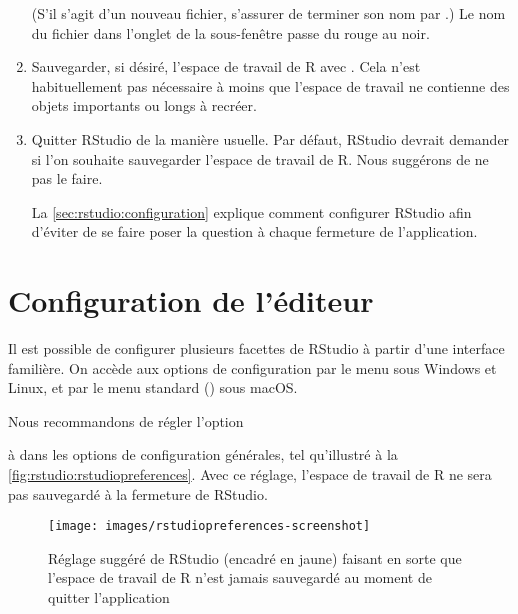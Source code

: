 \begin{enumerate}
\begin{trivlist}
    \hfill
  \end{trivlist}
  (S'il s'agit d'un nouveau fichier, s'assurer de terminer son nom par
  .) Le nom du fichier dans l'onglet de la sous-fenêtre passe
  du rouge au noir.
\item Sauvegarder, si désiré, l'espace de travail de R avec
  . Cela n'est
  habituellement pas nécessaire à moins que l'espace de travail ne
  contienne des objets importants ou longs à recréer.
\item Quitter RStudio de la manière usuelle. Par défaut, RStudio
  devrait demander si l'on souhaite sauvegarder l'espace de travail de
  R. Nous suggérons de ne pas le faire.

  La \autoref{sec:rstudio:configuration} explique comment configurer
  RStudio afin d'éviter de se faire poser la question à chaque
  fermeture de l'application.
\end{enumerate}


\section{Configuration de l'éditeur}
\label{sec:rstudio:configuration}

Il est possible de configurer plusieurs facettes de RStudio à partir
d'une interface familière. On accède aux options de configuration par
le menu  sous Windows et Linux, et par le
menu standard  (\code{\cmdkey\,,})
sous macOS.

Nous recommandons de régler l'option
\begin{quote}
\end{quote}
à  dans les options de configuration générales,
tel qu'illustré à la \autoref{fig:rstudio:rstudiopreferences}. Avec ce
réglage, l'espace de travail de R ne sera pas sauvegardé à la
fermeture de RStudio.

\begin{figure}
  \centering
  \texttt{[image: images/rstudiopreferences-screenshot]}
  \caption{Réglage suggéré de RStudio (encadré en jaune) faisant en
    sorte que l'espace de travail de R n'est jamais sauvegardé au
    moment de quitter l'application}
  \label{fig:rstudio:rstudiopreferences}
\end{figure}



